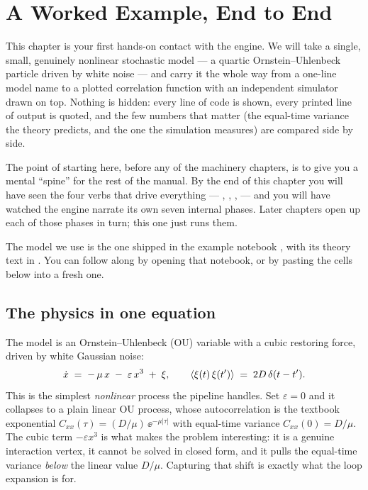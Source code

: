 \chapter{A Worked Example, End to End}\label{ch:quickstart}

This chapter is your first hands-on contact with the engine. We will take a
single, small, genuinely nonlinear stochastic model --- a quartic
Ornstein--Uhlenbeck particle driven by white noise --- and carry it the whole
way from a one-line model name to a plotted correlation function with an
independent simulator drawn on top. Nothing is hidden: every line of code is
shown, every printed line of output is quoted, and the few numbers that matter
(the equal-time variance the theory predicts, and the one the simulation
measures) are compared side by side.

The point of starting here, before any of the machinery chapters, is to give
you a mental ``spine'' for the rest of the manual. By the end of this chapter
you will have seen the four verbs that drive everything --- ,
, ,  --- and you will have watched
the engine narrate its own seven internal phases. Later chapters open up each of
those phases in turn; this one just runs them.

The model we use is the one shipped in the example notebook
, with its theory
text in . You can follow along by opening
that notebook, or by pasting the cells below into a fresh one.

\section{The physics in one equation}

The model is an Ornstein--Uhlenbeck (OU) variable with a cubic restoring force,
driven by white Gaussian noise:
\begin{equation}
  \dot x \;=\; -\,\mu\,x \;-\; \varepsilon\,x^{3} \;+\; \xi,
  \qquad
  \left\langle \xi(t)\,\xi(t') \right\rangle \;=\; 2D\,\delta(t-t').
  \label{eq:ouquartic}
\end{equation}
This is the simplest \emph{nonlinear} process the pipeline handles. Set
$\varepsilon = 0$ and it collapses to a plain linear OU process, whose
autocorrelation is the textbook exponential $C_{xx}(\tau) = (D/\mu)\,
\ee^{-\mu|\tau|}$ with equal-time variance $C_{xx}(0) = D/\mu$. The cubic term
$-\varepsilon x^{3}$ is what makes the problem interesting: it is a genuine
interaction vertex, it cannot be solved in closed form, and it pulls the
equal-time variance \emph{below} the linear value $D/\mu$. Capturing that shift
is exactly what the loop expansion is for.


